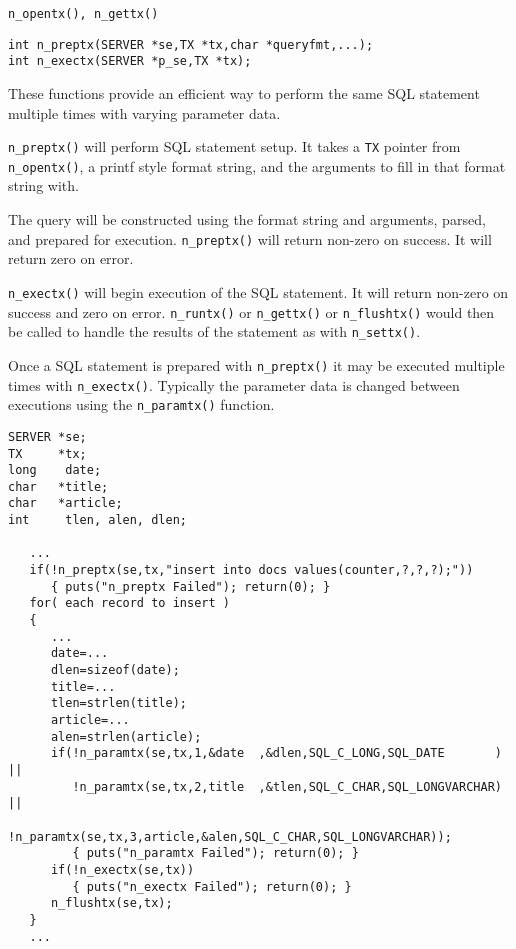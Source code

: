 \SEE
\begin{verbatim}
n_opentx(), n_gettx()
\end{verbatim}


\SYNOPSIS
\begin{verbatim}
int n_preptx(SERVER *se,TX *tx,char *queryfmt,...);
int n_exectx(SERVER *p_se,TX *tx);
\end{verbatim}

\DESCRIPTION

These functions provide an efficient way to perform the same
SQL statement multiple times with varying parameter data.

\verb`n_preptx()` will perform SQL statement setup.
It takes a \verb`TX` pointer
from \verb`n_opentx()`, a printf style format string, and the arguments
to fill in that format string with.

The query will be constructed using the format string and arguments,
parsed, and prepared for execution.  \verb`n_preptx()` will return non-zero
on success.  It will return zero on error.

\verb`n_exectx()` will begin execution of the SQL statement.
It will return non-zero on success and zero on error.
\verb`n_runtx()` or \verb`n_gettx()` or \verb`n_flushtx()` would
then be called to handle the results of the statement as with \verb`n_settx()`.

Once a SQL statement is prepared with \verb`n_preptx()` it may be
executed multiple times with \verb`n_exectx()`. Typically the parameter
data is changed between executions using the \verb`n_paramtx()` function.

\EXAMPLE
\begin{verbatim}
SERVER *se;
TX     *tx;
long    date;
char   *title;
char   *article;
int     tlen, alen, dlen;

   ...
   if(!n_preptx(se,tx,"insert into docs values(counter,?,?,?);"))
      { puts("n_preptx Failed"); return(0); }
   for( each record to insert )
   {
      ...
      date=...
      dlen=sizeof(date);
      title=...
      tlen=strlen(title);
      article=...
      alen=strlen(article);
      if(!n_paramtx(se,tx,1,&date  ,&dlen,SQL_C_LONG,SQL_DATE       ) ||
         !n_paramtx(se,tx,2,title  ,&tlen,SQL_C_CHAR,SQL_LONGVARCHAR) ||
         !n_paramtx(se,tx,3,article,&alen,SQL_C_CHAR,SQL_LONGVARCHAR));
         { puts("n_paramtx Failed"); return(0); }
      if(!n_exectx(se,tx))
         { puts("n_exectx Failed"); return(0); }
      n_flushtx(se,tx);
   }
   ...
\end{verbatim}


